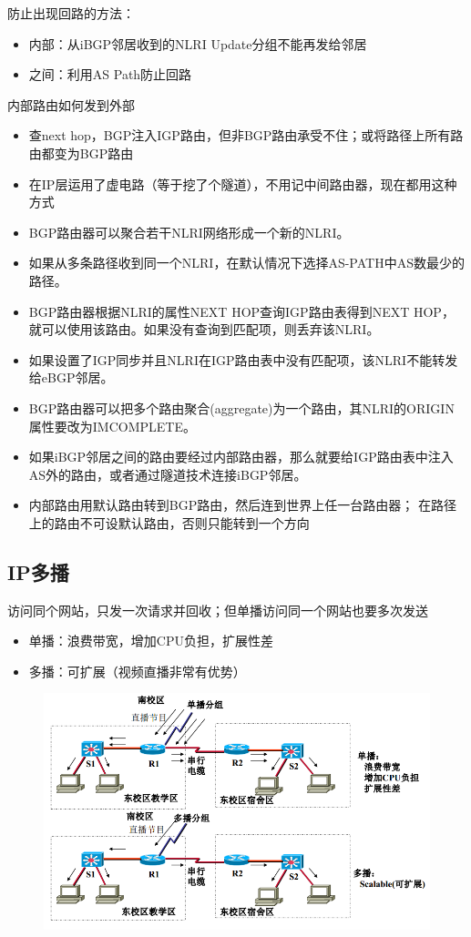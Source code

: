 防止出现回路的方法：
\begin{itemize}
\item 内部：从iBGP邻居收到的NLRI Update分组不能再发给邻居
\item 之间：利用AS Path防止回路
\end{itemize}

内部路由如何发到外部
\begin{itemize}
\item 查next hop，BGP注入IGP路由，但非BGP路由承受不住；或将路径上所有路由都变为BGP路由
\item 在IP层运用了虚电路（等于挖了个隧道），不用记中间路由器，现在都用这种方式
\end{itemize}

\begin{itemize}
\item BGP路由器可以聚合若干NLRI网络形成一个新的NLRI。
\item 如果从多条路径收到同一个NLRI，在默认情况下选择AS-PATH中AS数最少的路径。
\item BGP路由器根据NLRI的属性NEXT HOP查询IGP路由表得到NEXT HOP， 就可以使用该路由。如果没有查询到匹配项，则丢弃该NLRI。
\item 如果设置了IGP同步并且NLRI在IGP路由表中没有匹配项，该NLRI不能转发给eBGP邻居。
\item BGP路由器可以把多个路由聚合(aggregate)为一个路由，其NLRI的ORIGIN属性要改为IMCOMPLETE。
\item 如果iBGP邻居之间的路由要经过内部路由器，那么就要给IGP路由表中注入AS外的路由，或者通过隧道技术连接iBGP邻居。
\item 内部路由用默认路由转到BGP路由，然后连到世界上任一台路由器；
在路径上的路由不可设默认路由，否则只能转到一个方向
\end{itemize}

\subsection{IP多播}
访问同个网站，只发一次请求并回收；但单播访问同一个网站也要多次发送
\begin{itemize}
\item 单播：浪费带宽，增加CPU负担，扩展性差
\item 多播：可扩展（视频直播非常有优势）
\end{itemize}
\begin{figure}[H]
	\centering
	\includegraphics[width=0.8\linewidth]{fig/multicast.png}
\end{figure}

